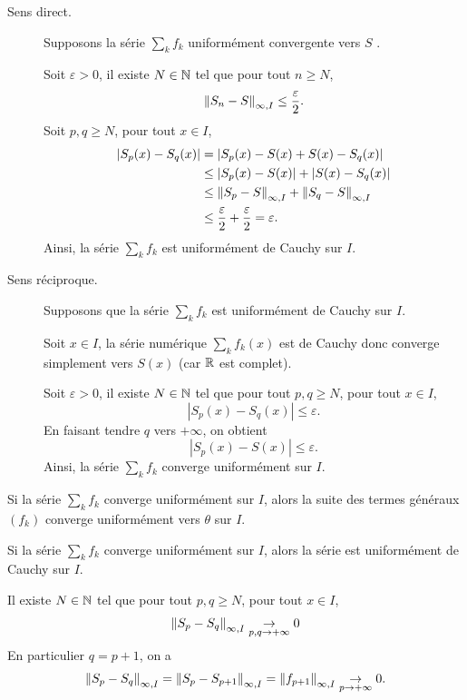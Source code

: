 \documentclass[a4paper,12pt]{article}
\begin{document}
\begin{demonstration}
    \begin{description}
        \item[Sens direct.] Supposons la série $\sum\limits_k f_k$ uniformément convergente vers $S$ .
        
        Soit $\varepsilon > 0$, il existe $N \in \mathbb{N}$ tel que pour tout $n \geq N$,
        $$
        \left\lVert S_n - S\right\rVert_{\infty, I} \leq \dfrac{\varepsilon}{2}.
        $$
        Soit $p, q \geq N$, pour tout $x \in I$,
        \begin{align*}
            |S_p(x) - S_q(x)| &= |S_p(x) - S(x) + S(x) - S_q(x)| \\
            &\leq |S_p(x) - S(x)| + |S(x) - S_q(x)| \\
            &\leq \left\lVert S_p - S\right\rVert_{\infty, I} + \left\lVert S_q - S\right\rVert_{\infty, I} \\
            &\leq \dfrac{\varepsilon}{2} + \dfrac{\varepsilon}{2} = \varepsilon.
        \end{align*}
        Ainsi, la série $\sum\limits_k f_k$ est uniformément de Cauchy sur $I$.

        \item[Sens réciproque.] Supposons que la série $\sum\limits_k f_k$ est uniformément de Cauchy sur $I$.
        
        Soit $x \in I$, la série numérique $\sum\limits_k f_k(x)$ est de Cauchy donc converge simplement vers $S(x)$ (car $\mathbb{R}$ est complet).
        
        Soit $\varepsilon > 0$, il existe $N \in \mathbb{N}$ tel que pour tout $p, q \geq N$, pour tout $x \in I$,
        $$
        |S_p(x) - S_q(x)| \leq \varepsilon.
        $$
        En faisant tendre $q$ vers $+\infty$, on obtient
        $$
        |S_p(x) - S(x)| \leq \varepsilon.
        $$
        Ainsi, la série $\sum\limits_k f_k$ converge uniformément sur $I$.
    \end{description}
\end{demonstration}

\begin{proposition}{}{}
    Si la série $\sum\limits_k f_k$ converge uniformément sur $I$, alors la suite des termes généraux $(f_k)$ converge uniformément vers $\theta$ sur $I$.
\end{proposition}

\begin{demonstration}
    Si la série $\sum\limits_k f_k$ converge uniformément sur $I$, alors la série est uniformément de Cauchy sur $I$.
    
    Il existe $N \in \mathbb{N}$ tel que pour tout $p, q \geq N$, pour tout $x \in I$,
    $$
    \left\lVert S_p - S_q\right\rVert_{\infty, I} \underset{p, q \to +\infty}{\to} 0
    $$
    En particulier $q = p + 1$, on a
    $$
    \left\lVert S_p - S_q\right\rVert_{\infty, I} = \left\lVert S_p - S_{p+1}\right\rVert_{\infty, I} = \left\lVert f_{p+1}\right\rVert_{\infty, I} \underset{p \to +\infty}{\to} 0.
    $$
\end{demonstration}
\end{document}
